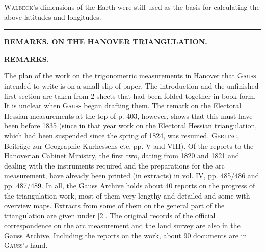\par\noindent\hspace*{\parindent}\textsc{Walbeck}'s dimensions of the Earth were still used as the basis for calculating the above latitudes and longitudes.
\begin{center}\rule{2.6cm}{0.4pt}\end{center}

\par\clearpage
\noindent\null\hfill{\small\textbf{REMARKS. ON THE HANOVER TRIANGULATION.}}\hfill{}\par\medskip
\begin{center}\textbf{REMARKS.}\end{center}
\begingroup\small
\par\noindent\hspace*{\parindent}The plan of the work on the trigonometric measurements in Hanover that \textsc{Gauss} intended to write is on a small slip of paper. The introduction and the unfinished first section are taken from 2 sheets that had been folded together in book form. It is unclear when \textsc{Gauss} began drafting them. The remark on the Electoral Hessian measurements at the top of p. 403, however, shows that this must have been before 1835 (since in that year work on the Electoral Hessian triangulation, which had been suspended since the spring of 1824, was resumed. \textsc{Gerling}, Beiträge zur Geographie Kurhessens etc. pp. V and VIII). Of the reports to the Hanoverian Cabinet Ministry, the first two, dating from 1820 and 1821 and dealing with the instruments required and the preparations for the arc measurement, have already been printed (in extracts) in vol. IV, pp. 485/486 and pp. 487/489. In all, the Gauss Archive holds about 40 reports on the progress of the triangulation work, most of them very lengthy and detailed and some with overview maps. Extracts from some of them on the general part of the triangulation are given under [2]. The original records of the official correspondence on the arc measurement and the land survey are also in the Gauss Archive. Including the reports on the work, about 90 documents are in \textsc{Gauss}'s hand.

